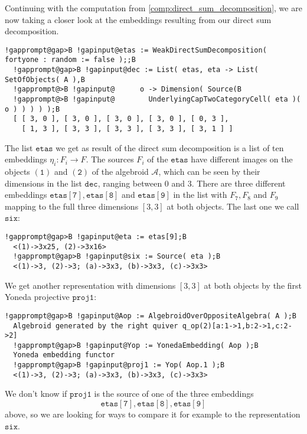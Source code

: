 \begin{computation}
Continuing with the computation from \ref{comp:direct_sum_decomposition}, we are now taking a closer look at the embeddings
resulting from our direct sum decomposition.
\begin{Verbatim}[commandchars=!@B,fontsize=\small,frame=single,label=Example]
  !gapprompt@gap>B !gapinput@etas := WeakDirectSumDecomposition( fortyone : random := false );;B
  !gapprompt@gap>B !gapinput@dec := List( etas, eta -> List( SetOfObjects( A ),B
  !gapprompt@>B !gapinput@      o -> Dimension( Source(B
  !gapprompt@>B !gapinput@        UnderlyingCapTwoCategoryCell( eta )( o ) ) ) ) );B
  [ [ 3, 0 ], [ 3, 0 ], [ 3, 0 ], [ 3, 0 ], [ 0, 3 ],
    [ 1, 3 ], [ 3, 3 ], [ 3, 3 ], [ 3, 3 ], [ 3, 1 ] ]
\end{Verbatim}
The list $\mathtt{etas}$ we get as result of the direct sum decomposition is a list of ten embeddings $\eta_{i} : F_{i} \rightarrow F$.
The sources $F_{i}$ of the $\mathtt{etas}$ have different images on the objects $\mathtt{(1)}$ and $\mathtt{(2)}$ of the algebroid $\mathcal{A}$,
which can be seen by their dimensions in the list $\mathtt{dec}$, ranging between $0$ and $3$.
There are three different embeddings $\mathtt{etas[7], etas[8]}$ and $\mathtt{etas[9]}$ in the list with $F_{7}, F_{8}$ and $F_{9}$
mapping to the full three dimensions $[ 3, 3 ]$ at both objects. The last one we call $\mathtt{six}$:
\begin{Verbatim}[commandchars=!@B,fontsize=\small,frame=single,label=Example]
  !gapprompt@gap>B !gapinput@eta := etas[9];B
  <(1)->3x25, (2)->3x16>
  !gapprompt@gap>B !gapinput@six := Source( eta );B
  <(1)->3, (2)->3; (a)->3x3, (b)->3x3, (c)->3x3>
\end{Verbatim}
We get another representation with dimensions $[ 3, 3 ]$ at both objects by the first Yoneda projective $\mathtt{proj1}$:
\begin{Verbatim}[commandchars=!@B,fontsize=\small,frame=single,label=Example]
  !gapprompt@gap>B !gapinput@Aop := AlgebroidOverOppositeAlgebra( A );B
  Algebroid generated by the right quiver q_op(2)[a:1->1,b:2->1,c:2->2]
  !gapprompt@gap>B !gapinput@Yop := YonedaEmbedding( Aop );B
  Yoneda embedding functor
  !gapprompt@gap>B !gapinput@proj1 := Yop( Aop.1 );B
  <(1)->3, (2)->3; (a)->3x3, (b)->3x3, (c)->3x3>
\end{Verbatim}
We don't know if $\mathtt{proj1}$ is the source of one of the three embeddings
\[
\mathtt{etas[7], etas[8], etas[9]}
\]
above, so
we are looking for ways to compare it for example to the representation $\mathtt{six}$.


\end{computation}
